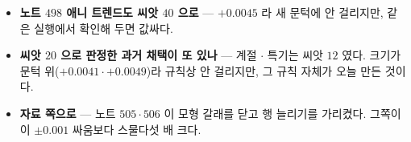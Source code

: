 \documentclass[11pt]{article}
\begin{document}
\begin{itemize}
\item \textbf{노트 $498$ 애니 트렌드도 씨앗 $40$ 으로} --- $+0.0045$ 라
새 문턱에 안 걸리지만, 같은 실행에서 확인해 두면 값싸다.
\item \textbf{씨앗 $20$ 으로 판정한 과거 채택이 또 있나} --- 계절 $\cdot$
특기는 씨앗 $12$ 였다. 크기가 문턱 위($+0.0041 \cdot +0.0049$)라 규칙상
안 걸리지만, 그 규칙 자체가 오늘 만든 것이다.
\item \textbf{자료 쪽으로} --- 노트 $505 \cdot 506$ 이 모형 갈래를 닫고
행 늘리기를 가리켰다. 그쪽이 이 $\pm 0.001$ 싸움보다 스물다섯 배 크다.
\end{itemize}
\end{document}
